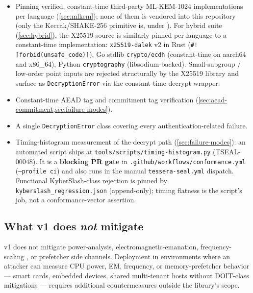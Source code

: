 \begin{itemize}
\item Pinning verified, constant-time third-party ML-KEM-1024 implementations per language (\cref{sec:mlkem}); none of them is vendored into this repository (only the Keccak/SHAKE-256 primitive is, under ). For hybrid suite  (\cref{sec:hybrid}), the X25519 source is similarly pinned per language to a constant-time implementation: \texttt{x25519-dalek} v2 in Rust (\texttt{\#![forbid(unsafe\_code)]}), Go stdlib \texttt{crypto/ecdh} (constant-time on aarch64 and x86\_64), Python \texttt{cryptography} (libsodium-backed). Small-subgroup / low-order point inputs are rejected structurally by the X25519 library and surface as \texttt{DecryptionError} via the constant-time decrypt wrapper.
\item Constant-time AEAD tag and commitment tag verification (\cref{sec:aead-commitment,sec:failure-modes}).
\item A single \texttt{DecryptionError} class covering every authentication-related failure.
\item Timing-histogram measurement of the decrypt path (\cref{sec:failure-modes}): an automated script ships at \texttt{tools/scripts/timing-histogram.py} (TSEAL-00048). It is a \textbf{blocking PR gate} in \texttt{.github/workflows/conformance.yml} (\texttt{--profile ci}) and also runs in the manual \texttt{tessera-seal.yml} dispatch. Functional KyberSlash-class rejection is pinned by \texttt{kyberslash\_regression.json} (append-only); timing flatness is the script's job, not a conformance-vector assertion.
\end{itemize}

\subsection{What v1 does \emph{not} mitigate}

\begin{calloutwarning}
\pqcrypt{} v1 does not mitigate power-analysis, electromagnetic-emanation, frequency-scaling \citep{hertzbleed,gofetch}, or prefetcher \citep{gofetch} side channels. Deployment in environments where an attacker can measure CPU power, EM, frequency, or memory-prefetcher behavior --- smart cards, embedded devices, shared multi-tenant hosts without DOIT-class mitigations \citep{intel-doit} --- requires additional countermeasures outside the library's scope.
\end{calloutwarning}

